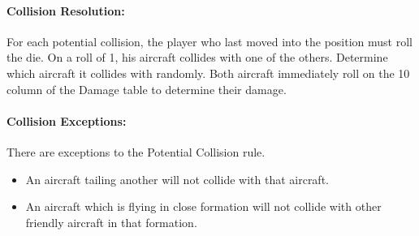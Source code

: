 \paragraph{Collision Resolution:} For each potential collision, the player who last moved into the position must roll the die. On a roll of 1, his aircraft collides with one of the others. Determine which aircraft it collides with randomly. Both aircraft immediately roll on the 10 column of the Damage table to determine their damage.

\paragraph{Collision Exceptions:} There are  exceptions to the Potential Collision rule.

\begin{itemize}
    \item An aircraft tailing another will not collide with that aircraft.
    \item An aircraft which is flying in close formation will not collide with other friendly aircraft in that formation.
\end{itemize}


